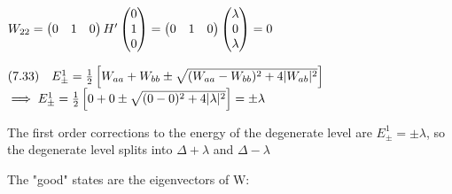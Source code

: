 \documentclass[14pt]{extarticle}
\makeatletter
\newenvironment{lefteqs}{%
    \begin{flushleft}%
    \renewcommand{\arraystretch}{1.3}%
    $\begin{array}{@{}l@{}}%
}{%
    \end{array}$%
    \end{flushleft}%
}
\makeatother
\begin{document}
\begin{lefteqs}
    W_{22} = \begin{pmatrix}0 & 1 & 0\end {pmatrix} H' \begin{pmatrix}0 \\ 1 \\ 0\end{pmatrix}
    = \begin{pmatrix}0 & 1 & 0 \end{pmatrix} \begin{pmatrix} \lambda \\ 0 \\ \lambda \end{pmatrix} = 0
\end{lefteqs}

\begin{lefteqs}
    \text{(7.33)} \quad E^1_{\pm} = \frac{1}{2} \left[ W_{aa} + W_{bb} \pm \sqrt{(W_{aa} - W_{bb})^2 + 4 |W_{ab}|^2} \right] \\
    \implies  E^1_{\pm} = \frac{1}{2} \left[ 0 + 0 \pm \sqrt{(0 - 0)^2 + 4 |\lambda|^2} \right] = \pm \lambda
\end{lefteqs}

The first order corrections to the energy of the degenerate level are $E^1_{\pm} = \pm \lambda$,
so the degenerate level splits into $\Delta + \lambda$ and $\Delta - \lambda$

The "good" states are the eigenvectors of W:
\end{document}
